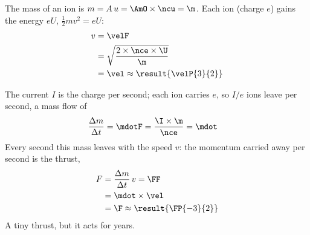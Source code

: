 \begin{abcliste}
\abc The mass of an ion is $m = A\,u = \AmO\times\ncu = \m$. Each ion (charge $e$) gains the energy $e U$, $\frac{1}{2} m v^2 = e U$:
\begin{align}
 v &= \velF \\
   &= \sqrt{\frac{2\times\nce\times\U}{\m}} \\
   &= \vel \approx \result{\velP{3}{2}}
\end{align}

\abc The current $I$ is the charge per second; each ion carries $e$, so $I/e$ ions leave per second, a mass flow of
\begin{align}
 \frac{\Delta m}{\Delta t} &= \mdotF = \frac{\I\times\m}{\nce} = \mdot
\end{align}
Every second this mass leaves with the speed $v$: the momentum carried away per second is the thrust,
\begin{align}
 F &= \frac{\Delta m}{\Delta t}\,v = \FF \\
   &= \mdot\times\vel \\
   &= \F \approx \result{\FP{-3}{2}}
\end{align}
A tiny thrust, but it acts for years.
\end{abcliste}
